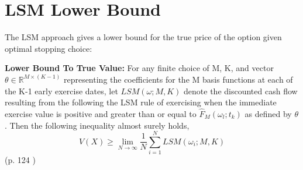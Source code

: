 \section{LSM Lower Bound}\label{LSMLowerBound}
The LSM approach gives a lower bound for the true price of the option given optimal stopping choice:
\theoremstyle{proposition}
\begin{proposition}{\textbf{Lower Bound To True Value: }}\label{Lower-Bound-LSM}
For any finite choice of M, K, and vector $\theta\in \mathbb{R}^{M \times (K-1)}$ representing the coefficients for the M basis functions at each of the K-1 early exercise dates, let $LSM(\omega;M,K)$ denote the discounted cash flow resulting from the following the LSM rule of exercising when the immediate exercise value is positive and greater than or equal to $\hat{F}_{M}(\omega_{l};t_{k})$ as defined by $\theta$. Then the following inequality almost surely holds,
$$V(X)\geq \lim_{N\to \infty} \dfrac{1}{N}\sum_{i=1}^{N} LSM(\omega_i;M,K)$$
\null \hfill (p. 124 \parencite{LSM})
\end{proposition}